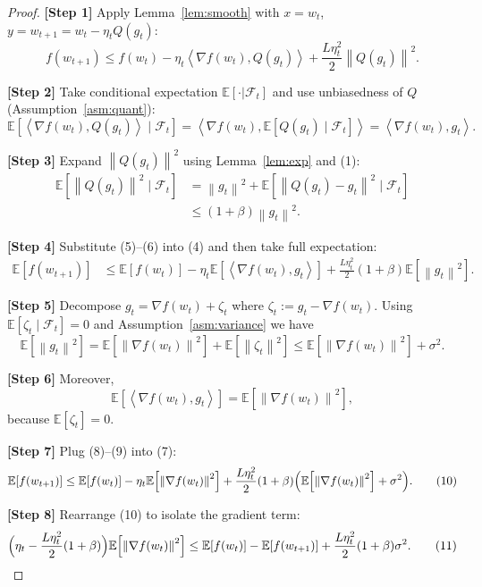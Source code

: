\documentclass{article}
\newcommand{\E}{\mathbb{E}}
\newcommand{\norm}[1]{\left\|#1\right\|}
\newcommand{\iprod}[2]{\left\langle #1,#2\right\rangle}
\begin{document}
\begin{proof}
\textbf{[Step 1]}  Apply Lemma~\ref{lem:smooth} with $x=w_t$, $y=w_{t+1}=w_t-\eta_t Q(g_t)$:
\[
f(w_{t+1})\le f(w_t)-\eta_t\iprod{\nabla f(w_t)}{Q(g_t)}+\frac{L\eta_t^{2}}{2}\norm{Q(g_t)}^{2}.
\tag{4}
\]

\textbf{[Step 2]}  Take conditional expectation $\E[\cdot|\mathcal F_t]$ and use unbiasedness of $Q$ (Assumption~\ref{asm:quant}):
\[
\E\!\left[\iprod{\nabla f(w_t)}{Q(g_t)}\mid\mathcal F_t\right]
= \iprod{\nabla f(w_t)}{\E[Q(g_t)\mid\mathcal F_t]}
= \iprod{\nabla f(w_t)}{g_t}.
\tag{5}
\]

\textbf{[Step 3]}  Expand $\norm{Q(g_t)}^{2}$ using Lemma~\ref{lem:exp} and (1):
\[
\begin{aligned}
\E\!\left[\norm{Q(g_t)}^{2}\mid\mathcal F_t\right]
&= \norm{g_t}^{2}+\E\!\left[\norm{Q(g_t)-g_t}^{2}\mid\mathcal F_t\right] \\
&\le (1+\beta)\norm{g_t}^{2}.
\end{aligned}
\tag{6}
\]

\textbf{[Step 4]}  Substitute (5)–(6) into (4) and then take full expectation:
\[
\begin{aligned}
\E[f(w_{t+1})]
&\le \E[f(w_t)]-\eta_t\E\!\left[\iprod{\nabla f(w_t)}{g_t}\right]
+\frac{L\eta_t^{2}}{2}(1+\beta)\E\!\left[\norm{g_t}^{2}\right].
\end{aligned}
\tag{7}
\]

\textbf{[Step 5]}  Decompose $g_t=\nabla f(w_t)+\zeta_t$ where $\zeta_t:=g_t-\nabla f(w_t)$.
Using $\E[\zeta_t\mid\mathcal F_t]=0$ and Assumption~\ref{asm:variance} we have
\[
\E\!\left[\norm{g_t}^{2}\right]=\E\!\left[\norm{\nabla f(w_t)}^{2}\right]+\E\!\left[\norm{\zeta_t}^{2}\right]
\le \E\!\left[\norm{\nabla f(w_t)}^{2}\right]+\sigma^{2}.
\tag{8}
\]

\textbf{[Step 6]}  Moreover,
\[
\E\!\left[\iprod{\nabla f(w_t)}{g_t}\right]
=\E\!\left[\norm{\nabla f(w_t)}^{2}\right],
\tag{9}
\]
because $\E[\zeta_t]=0$.

\textbf{[Step 7]}  Plug (8)–(9) into (7):
\[
\E[f(w_{t+1})]\le \E[f(w_t)]-\eta_t\E\!\left[\norm{\nabla f(w_t)}^{2}\right]
+\frac{L\eta_t^{2}}{2}(1+\beta)\Bigl(\E\!\left[\norm{\nabla f(w_t)}^{2}\right]+\sigma^{2}\Bigr).
\tag{10}
\]

\textbf{[Step 8]}  Rearrange (10) to isolate the gradient term:
\[
\Bigl(\eta_t-\frac{L\eta_t^{2}}{2}(1+\beta)\Bigr)\E\!\left[\norm{\nabla f(w_t)}^{2}\right]
\le \E[f(w_t)]-\E[f(w_{t+1})]+\frac{L\eta_t^{2}}{2}(1+\beta)\sigma^{2}.
\tag{11}
\]


\end{proof}
\end{document}
